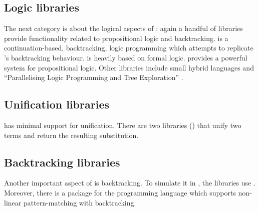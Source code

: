 \documentclass[thesis-solanki.tex]{subfiles}
\begin{document}
\subsection{Logic libraries}

The next category is about the logical aspects of ; again a handful of libraries provide
functionality related to propositional logic and backtracking.
\cite{logict-lib} is a continuation-based, backtracking, logic programming  which attempts
to replicate
's backtracking behaviour.
 is heavily based on formal logic.
\cite{proplogic-lib} provides a powerful system for propositional logic.
Other libraries include small hybrid languages \cite{cflp-lib} and ``Parallelising Logic Programming and Tree
Exploration'' \cite{logic-grows-on-trees-lib}.


\subsection{Unification libraries}
 has minimal support for unification.
There are two libraries (\cite{cmu-lib,unification-fd-lib}) that unify two terms and return
the resulting substitution.


\subsection{Backtracking libraries}

Another important aspect of  is backtracking.
To simulate it in , the libraries \cite{stream-monad-lib, logicst-lib} use .
Moreover, there is a package for the  programming language \cite{egison-lib} which supports
non-linear pattern-matching with backtracking.


\end{document}
